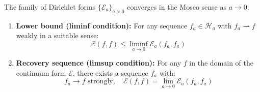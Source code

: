 \begin{theorem}
\label{thm:mosco-ym-dirichlet}
The family of Dirichlet forms $\{\mathcal{E}_a\}_{a > 0}$ converges in the 
Mosco sense as $a \to 0$:
\begin{enumerate}[label=(\roman*)]
\item \textbf{Lower bound (liminf condition):} For any sequence $f_a \in \mathcal{H}_a$ 
with $f_a \rightharpoonup f$ weakly in a suitable sense:
\[
\mathcal{E}(f, f) \leq \liminf_{a \to 0} \mathcal{E}_a(f_a, f_a)
\]
\item \textbf{Recovery sequence (limsup condition):} For any $f$ in the domain 
of the continuum form $\mathcal{E}$, there exists a sequence $f_a$ with:
\[
f_a \to f \text{ strongly}, \quad \mathcal{E}(f, f) = \lim_{a \to 0} \mathcal{E}_a(f_a, f_a)
\]
\end{enumerate}
\end{theorem}

